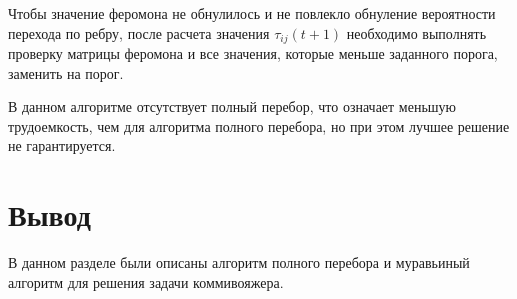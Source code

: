 Чтобы значение феромона не обнулилось и не повлекло обнуление вероятности перехода по ребру, после расчета значения $\tau_{ij}(t+1)$ необходимо выполнять проверку матрицы феромона и все значения, которые меньше заданного порога, заменить на порог.

В данном алгоритме отсутствует полный перебор, что означает меньшую трудоемкость, чем для алгоритма полного перебора, но при этом лучшее решение не гарантируется.
 

\section*{Вывод}

В данном разделе были описаны алгоритм полного перебора и муравьиный алгоритм для решения задачи коммивояжера.




